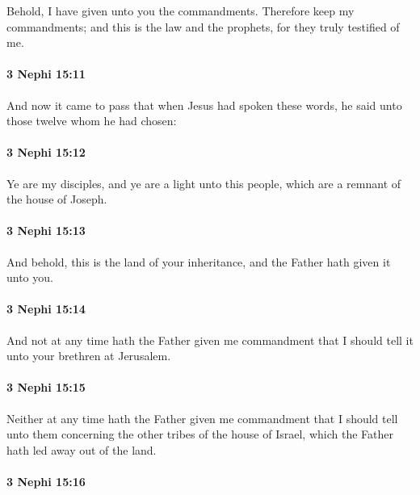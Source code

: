 			Behold, I have given unto you the commandments.
			Therefore keep my commandments;
			and this is the law and the prophets,
			for they truly testified of me.

		\paragraph{3 Nephi 15:11} %
			\label{3NEPHI-15-11}

			And now it came to pass that when Jesus had spoken these words,
			he said unto those twelve whom he had chosen:

		\paragraph{3 Nephi 15:12} %
			\label{3NEPHI-15-12}

			Ye are my disciples,
			and ye are a light unto this people,
			which are a remnant of the house of Joseph.

		\paragraph{3 Nephi 15:13} %
			\label{3NEPHI-15-13}

			And behold, this is the land of your inheritance,
			and the Father hath given it unto you.

		\paragraph{3 Nephi 15:14} %
			\label{3NEPHI-15-14}

			And not at any time hath the Father given me commandment
			that I should tell it unto your brethren at Jerusalem.

		\paragraph{3 Nephi 15:15} %
			\label{3NEPHI-15-15}

			Neither at any time hath the Father given me commandment
			that I should tell unto them concerning the other tribes of the house of Israel,
			which the Father hath led away out of the land.

		\paragraph{3 Nephi 15:16} %
			\label{3NEPHI-15-16}

